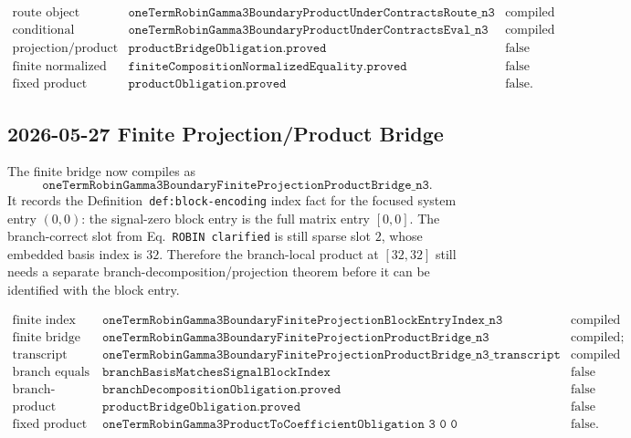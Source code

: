 \[
\begin{array}{lll}
\text{route object} & \texttt{oneTermRobinGamma3BoundaryProductUnderContractsRoute\_n3} & \text{compiled}\\
\text{conditional coefficient theorem} & \texttt{oneTermRobinGamma3BoundaryProductUnderContractsEval\_n3} & \text{compiled}\\
\text{projection/product bridge} & \texttt{productBridgeObligation.proved} & \text{false}\\
\text{finite normalized block equality} & \texttt{finiteCompositionNormalizedEquality.proved} & \text{false}\\
\text{fixed product theorem} & \texttt{productObligation.proved} & \text{false}.
\end{array}
\]

\subsection{2026-05-27 Finite Projection/Product Bridge}

The finite bridge now compiles as
\[
  \texttt{oneTermRobinGamma3BoundaryFiniteProjectionProductBridge\_n3}.
\]
It records the Definition~\texttt{def:block-encoding} index fact for the
focused system entry \((0,0)\): the signal-zero block entry is the full matrix
entry \([0,0]\).  The branch-correct slot from Eq.~\texttt{ROBIN clarified}
is still sparse slot \(2\), whose embedded basis index is \(32\).  Therefore
the branch-local product at \([32,32]\) still needs a separate
branch-decomposition/projection theorem before it can be identified with the
block entry.

\[
\begin{array}{lll}
\text{finite index lemma} & \texttt{oneTermRobinGamma3BoundaryFiniteProjectionBlockEntryIndex\_n3} & \text{compiled}\\
\text{finite bridge} & \texttt{oneTermRobinGamma3BoundaryFiniteProjectionProductBridge\_n3} & \text{compiled; flags false}\\
\text{transcript theorem} & \texttt{oneTermRobinGamma3BoundaryFiniteProjectionProductBridge\_n3\_transcript} & \text{compiled}\\
\text{branch equals block index} & \texttt{branchBasisMatchesSignalBlockIndex} & \text{false}\\
\text{branch-decomposition theorem} & \texttt{branchDecompositionObligation.proved} & \text{false}\\
\text{product bridge} & \texttt{productBridgeObligation.proved} & \text{false}\\
\text{fixed product theorem} & \texttt{oneTermRobinGamma3ProductToCoefficientObligation\ 3\ 0\ 0} & \text{false}.
\end{array}
\]

